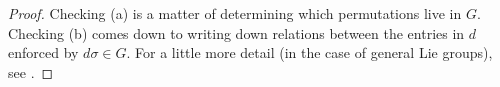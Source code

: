 \begin{proof}
    Checking (a) is a matter of determining which permutations live in $G$. Checking (b) comes down to writing down relations between the entries in $d$ enforced by $d\sigma\in G$. For a little more detail (in the case of general Lie groups), see \cite[Exercise~7.16]{kirillov-lie-algebra}.
\end{proof}
